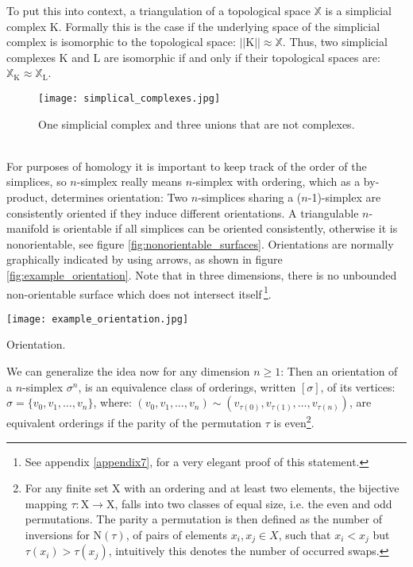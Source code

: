 To put this into context, a triangulation of a topological space $\mathbb{X}$ is a simplicial complex $\mathrm{K}$.
Formally this is the case if the underlying space of the simplicial complex is isomorphic to the topological space: $||\mathrm{K}|| \approx \mathbb{X}$.
Thus, two simplicial complexes $\mathrm{K}$ and $\mathrm{L}$ are isomorphic if and only if their topological spaces are: $\mathbb{X}_{\mathrm{K}} \approx \mathbb{X}_{\mathrm{L}}$.
\begin{figure}[ht]
\centering
\texttt{[image: simplical\_complexes.jpg]}
\caption{One simplicial complex and three unions that are not complexes.}
\label{fig:simplical_complexes}
\end{figure}\\
For purposes of homology it is important to keep track of the order of the simplices, so $n$-simplex really means $n$-simplex with ordering, which as a by-product, determines orientation:
Two $n$-simplices sharing a ($n$-1)-simplex are consistently oriented if they induce different orientations.
A triangulable $n$-manifold is orientable if all simplices can be oriented consistently, otherwise it is nonorientable, see figure \ref{fig:nonorientable_surfaces}.
Orientations are normally graphically indicated by using arrows, as shown in figure \ref{fig:example_orientation}.
Note that in three dimensions, there is no unbounded non-orientable surface which does not intersect itself\,\footnote{ See appendix \ref{appendix7}, for a very elegant proof of this statement.}.
\begin{floatingfigure}[r]{0.30\textwidth}
\centering
\texttt{[image: example\_orientation.jpg]}
\caption{Orientation.}
\label{fig:example_orientation}
\end{floatingfigure}
We can generalize the idea now for any dimension $n \geq 1$:
Then an orientation of a $n$-simplex $\sigma^{n}$, is an equivalence class of orderings, written $[\sigma]$, of its vertices: $\sigma = \{v_{0}, v_{1}, \dots , v_{n}\}$, where: $(v_{0}, v_{1}, \dots , v_{n}) \sim (v_{\tau(0)}, v_{\tau(1)}, \dots , v_{\tau(n)})$, are equivalent orderings if the parity of the permutation $\tau$ is even\footnote{ For any finite set $\mathrm{X}$ with an ordering and at least two elements, the bijective mapping $\tau : \mathrm{X} \rightarrow \mathrm{X}$, falls into two classes of equal size, i.e. the even and odd permutations. The parity a permutation is then defined as the number of inversions for $\mathrm{N}(\tau)$, of pairs of elements $x_{i}, x_{j} \in X$, such that $x_{i} < x_{j}$ but $\tau(x_{i}) > \tau(x_{j})$, intuitively this denotes the number of occurred swaps.}.\\

